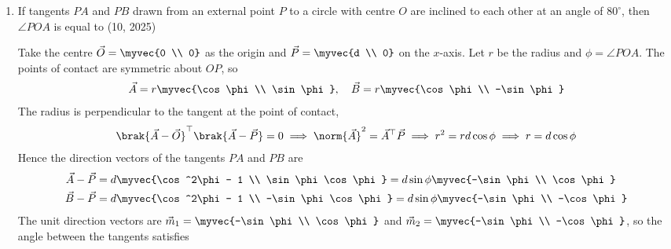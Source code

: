 \begin{enumerate}[label=\thesubsection.\arabic*, ref=\thesubsection.\theenumi]
\item
If tangents $PA$ and $PB$ drawn from an external point $P$ to a circle with centre $O$ are inclined to each other at an angle of $80^\circ$, then $\angle POA$ is equal to
\hfill (10, 2025)
\begin{enumerate}
	\begin{multicols}{4}
    \item $40^\circ$
    \item $50^\circ$
    \item $60^\circ$
    \item $80^\circ$
	\end{multicols}
\end{enumerate}
\solution
Take the centre $\vec{O} = \myvec{0 \\ 0}$ as the origin and $\vec{P} = \myvec{d \\ 0}$ on the $x$-axis. Let $r$ be the radius and $\phi = \angle POA$. The points of contact are symmetric about $OP$, so
\begin{align}
	\vec{A} = r\myvec{\cos\phi \\ \sin\phi}, \quad \vec{B} = r\myvec{\cos\phi \\ -\sin\phi}
\end{align}
The radius is perpendicular to the tangent at the point of contact,
\begin{align}
	\brak{\vec{A}-\vec{O}}^{\top}\brak{\vec{A}-\vec{P}} = 0 \implies \norm{\vec{A}}^2 = \vec{A}^{\top}\vec{P}
	\implies r^2 = rd\cos\phi \implies r = d\cos\phi
\end{align}
Hence the direction vectors of the tangents $PA$ and $PB$ are
\begin{align}
	\vec{A}-\vec{P} &= d\myvec{\cos^2\phi - 1 \\ \sin\phi\cos\phi} = d\sin\phi\myvec{-\sin\phi \\ \cos\phi}
	\\
	\vec{B}-\vec{P} &= d\myvec{\cos^2\phi - 1 \\ -\sin\phi\cos\phi} = d\sin\phi\myvec{-\sin\phi \\ -\cos\phi}
\end{align}
The unit direction vectors are $\vec{m}_1 = \myvec{-\sin\phi \\ \cos\phi}$ and $\vec{m}_2 = \myvec{-\sin\phi \\ -\cos\phi}$, so the angle between the tangents satisfies
\begin{align}

\end{align}
\end{enumerate}
